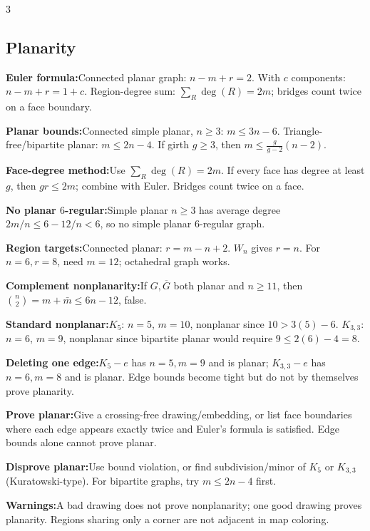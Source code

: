 \documentclass[10pt]{article}
\newenvironment{cheatitems}{\par\vspace{-1pt}}{\par\vspace{-1pt}}
\newcommand{\cheatrow}[2]{\par\noindent\textbf{#1:}\enspace #2\par}
\begin{document}
\begin{multicols}{3}
\subsection*{Planarity}
\begin{cheatitems}
\cheatrow{Euler formula}{Connected planar graph: $n-m+r=2$. With $c$ components: $n-m+r=1+c$. Region-degree sum: $\sum_R\deg(R)=2m$; bridges count twice on a face boundary.}
\cheatrow{Planar bounds}{Connected simple planar, $n\ge3$: $m\le3n-6$. Triangle-free/bipartite planar: $m\le2n-4$. If girth $g\ge3$, then $m\le\frac{g}{g-2}(n-2)$.}
\cheatrow{Face-degree method}{Use $\sum_R\deg(R)=2m$. If every face has degree at least $g$, then $gr\le2m$; combine with Euler. Bridges count twice on a face.}
\cheatrow{No planar $6$-regular}{Simple planar $n\ge3$ has average degree $2m/n\le6-12/n<6$, so no simple planar $6$-regular graph.}
\cheatrow{Region targets}{Connected planar: $r=m-n+2$. $W_n$ gives $r=n$. For $n=6,r=8$, need $m=12$; octahedral graph works.}
\cheatrow{Complement nonplanarity}{If $G,\overline G$ both planar and $n\ge11$, then $\binom n2=m+\bar m\le6n-12$, false.}
\cheatrow{Standard nonplanar}{$K_5$: $n=5$, $m=10$, nonplanar since $10>3(5)-6$. $K_{3,3}$: $n=6$, $m=9$, nonplanar since bipartite planar would require $9\le2(6)-4=8$.}
\cheatrow{Deleting one edge}{$K_5-e$ has $n=5,m=9$ and is planar; $K_{3,3}-e$ has $n=6,m=8$ and is planar. Edge bounds become tight but do not by themselves prove planarity.}
\cheatrow{Prove planar}{Give a crossing-free drawing/embedding, or list face boundaries where each edge appears exactly twice and Euler's formula is satisfied. Edge bounds alone cannot prove planar.}
\cheatrow{Disprove planar}{Use bound violation, or find subdivision/minor of $K_5$ or $K_{3,3}$ (Kuratowski-type). For bipartite graphs, try $m\le2n-4$ first.}
\cheatrow{Warnings}{A bad drawing does not prove nonplanarity; one good drawing proves planarity. Regions sharing only a corner are not adjacent in map coloring.}
\end{cheatitems}


\end{multicols}
\end{document}
